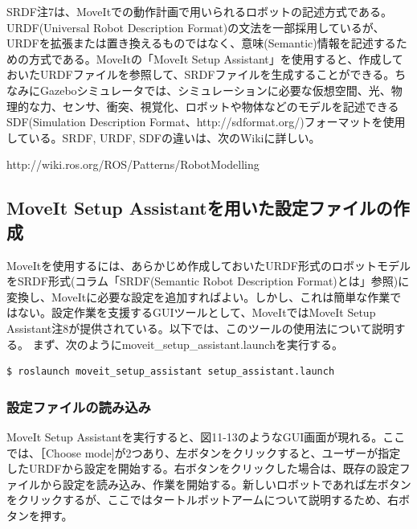 \begin{exercise}
SRDF注7は、MoveItでの動作計画で用いられるロボットの記述方式である。URDF(Universal Robot Description Format)の文法を一部採用しているが、URDFを拡張または置き換えるものではなく、意味(Semantic)情報を記述するための方式である。MoveItの「MoveIt Setup Assistant」を使用すると、作成しておいたURDFファイルを参照して、SRDFファイルを生成することができる。ちなみにGazeboシミュレータでは、シミュレーションに必要な仮想空間、光、物理的な力、センサ、衝突、視覚化、ロボットや物体などのモデルを記述できるSDF(Simulation Description Format、http://sdformat.org/)フォーマットを使用している。SRDF, URDF, SDFの違いは、次のWikiに詳しい。

http://wiki.ros.org/ROS/Patterns/RobotModelling
\end{exercise}

\subsection{MoveIt Setup Assistantを用いた設定ファイルの作成}

MoveItを使用するには、あらかじめ作成しておいたURDF形式のロボットモデルをSRDF形式(コラム「SRDF(Semantic Robot Description Format)とは」参照)に変換し、MoveItに必要な設定を追加すればよい。しかし、これは簡単な作業ではない。設定作業を支援するGUIツールとして、MoveItではMoveIt Setup Assistant注8が提供されている。以下では、このツールの使用法について説明する。
まず、次のようにmoveit\_setup\_assistant.launchを実行する。

\begin{lstlisting}[language=ROS]
$ roslaunch moveit_setup_assistant setup_assistant.launch
\end{lstlisting}

\subsubsection{設定ファイルの読み込み}

MoveIt Setup Assistantを実行すると、図11-13のようなGUI画面が現れる。ここでは、［Choose mode]が2つあり、左ボタンをクリックすると、ユーザーが指定したURDFから設定を開始する。右ボタンをクリックした場合は、既存の設定ファイルから設定を読み込み、作業を開始する。新しいロボットであれば左ボタンをクリックするが、ここではタートルボットアームについて説明するため、右ボタンを押す。

